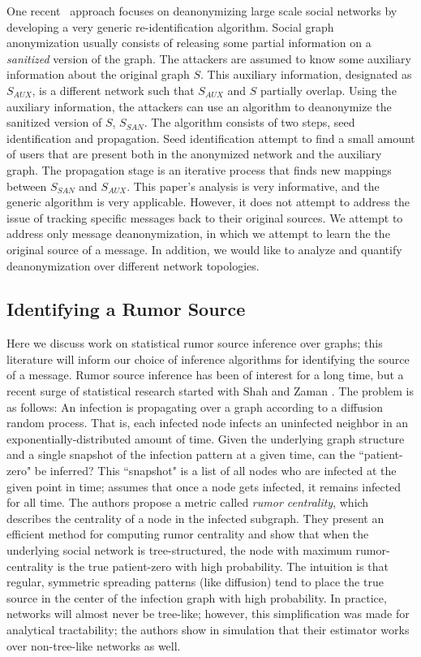 One recent~\cite{narayanan2009anonymizing} approach focuses on deanonymizing large scale social networks by developing a very generic re-identification algorithm. Social graph \\ anonymization usually consists of releasing some partial information on a \emph{sanitized} version of the graph. 
The attackers are assumed to know some auxiliary information about the original graph $S$. This auxiliary information, designated as $S_{AUX}$, is a different network such that $S_{AUX}$ and $S$ partially overlap. Using the auxiliary information, the attackers can use an algorithm to deanonymize the sanitized version of $S$, $S_{SAN}$.
The algorithm consists of two steps, seed identification and propagation. Seed identification attempt to find a small amount of users that are present both in the anonymized network and the auxiliary graph. The propagation stage is an iterative process that finds new mappings between $S_{SAN}$ and $S_{AUX}$. This paper's analysis is very informative, and the generic algorithm is very applicable. However, it does not attempt to address the issue of tracking specific messages back to their original sources. We attempt to address only message deanonymization, in which we attempt to learn the the original source of a message. In addition, we would like to analyze and quantify deanonymization over different network topologies.

\subsection{Identifying a Rumor Source}
Here we discuss work on statistical rumor source inference over graphs; this literature will inform our choice of inference algorithms for identifying the source of a message.
Rumor source inference has been of interest for a long time, but a recent surge of statistical research started with Shah and Zaman \cite{shah2011rumors}. The problem is as follows: An infection is propagating over a graph according to a diffusion random process. 
That is, each infected node infects an uninfected neighbor in an exponentially-distributed amount of time.
Given the underlying graph structure and a single snapshot of the infection pattern at a given time, can the ``patient-zero" be inferred?
This ``snapshot" is a list of all nodes who are infected at the given point in time; \cite{shah2011rumors} assumes that once a node gets infected, it remains infected for all time. 
The authors propose a metric called \emph{rumor centrality}, which describes the centrality of a node in the infected subgraph.
They present an efficient method for computing rumor centrality and show that when the underlying social network is tree-structured, the node with maximum rumor-centrality is the true patient-zero with high probability. The intuition is that regular, symmetric spreading patterns (like diffusion) tend to place the true source in the center of the infection graph with high probability. In practice, networks will almost never be tree-like; however, this simplification was made for analytical tractability; the authors show in simulation that their estimator works over non-tree-like networks as well. 

